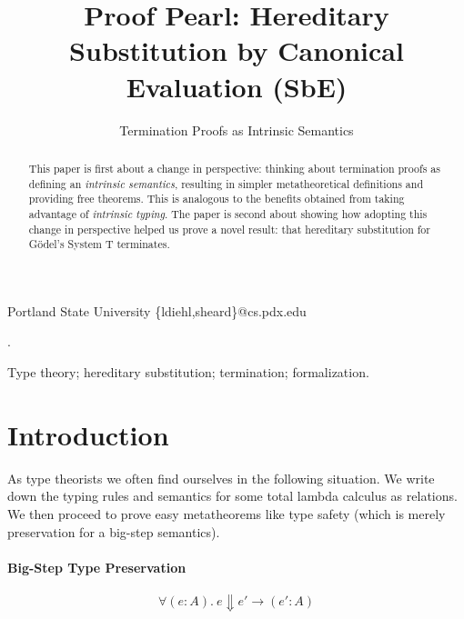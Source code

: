 \documentclass[preprint,nonatbib]{sigplanconf}
\numberwithin{mysubdfn}{mydfn}
\def\bigstep{\Downarrow}
\def\marr{\rightarrow}
\newcommand{\ascribe}[2]{(#1 : #2)}
\newcommand{\all}[1]{\forall#1.~}
\begin{document}
\setlength{\pdfpageheight}{\paperheight}
\setlength{\pdfpagewidth}{\paperwidth}


\title{Proof Pearl: Hereditary Substitution by Canonical Evaluation (SbE)}
\subtitle{Termination Proofs as Intrinsic Semantics}

           {Portland State University}
           {\{ldiehl,sheard\}@cs.pdx.edu}

\maketitle

\begin{abstract}
This paper is first about a change in perspective: thinking about
termination proofs as defining an {\it intrinsic semantics}, resulting
in simpler metatheoretical definitions and providing free theorems.
This is analogous to the benefits obtained from taking advantage of
{\it intrinsic typing}.
The paper is second about showing how
adopting this change in perspective helped us prove a novel result:
that hereditary substitution for G{\"o}del's System T terminates.
\end{abstract}

.

\keywords
Type theory; hereditary substitution; termination; formalization.

\section{Introduction}
\label{sec:intro}

As type theorists we often find ourselves in the following situation.
We write down the typing rules and semantics for some total lambda
calculus as relations. 
We then proceed to prove easy metatheorems like type safety (which is merely
preservation for a big-step semantics).

\paragraph{Big-Step Type Preservation}

$$
\all{\ascribe{e}{A}} e \bigstep e' \marr \ascribe{e'}{A}
$$
\end{document}
